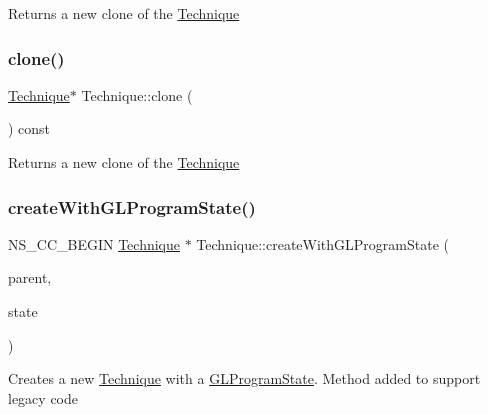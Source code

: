 Returns a new clone of the \hyperlink{classTechnique}{Technique} \mbox{\label{classTechnique_a725b9c83407cacf2c8b5a0554ded2368}} 
\subsubsection{\texorpdfstring{clone()}{clone()}\hspace{0.1cm}{\footnotesize\ttfamily [2/2]}}
{\footnotesize\ttfamily \hyperlink{classTechnique}{Technique}$\ast$ Technique\+::clone (\begin{DoxyParamCaption}{ }\end{DoxyParamCaption}) const}

Returns a new clone of the \hyperlink{classTechnique}{Technique} \mbox{\label{classTechnique_a6b03102ac3089edc852853f267a7b523}} 
\subsubsection{\texorpdfstring{create\+With\+G\+L\+Program\+State()}{createWithGLProgramState()}\hspace{0.1cm}{\footnotesize\ttfamily [1/2]}}
{\footnotesize\ttfamily N\+S\+\_\+\+C\+C\+\_\+\+B\+E\+G\+IN \hyperlink{classTechnique}{Technique} $\ast$ Technique\+::create\+With\+G\+L\+Program\+State (\begin{DoxyParamCaption}\item[{\hyperlink{classMaterial}{Material} $\ast$}]{parent,  }\item[{\hyperlink{classGLProgramState}{G\+L\+Program\+State} $\ast$}]{state }\end{DoxyParamCaption})\hspace{0.3cm}{\ttfamily [static]}}

Creates a new \hyperlink{classTechnique}{Technique} with a \hyperlink{classGLProgramState}{G\+L\+Program\+State}. Method added to support legacy code \mbox{\label{classTechnique_a14c1fb1983007283d0c8107a73116adc}} 
